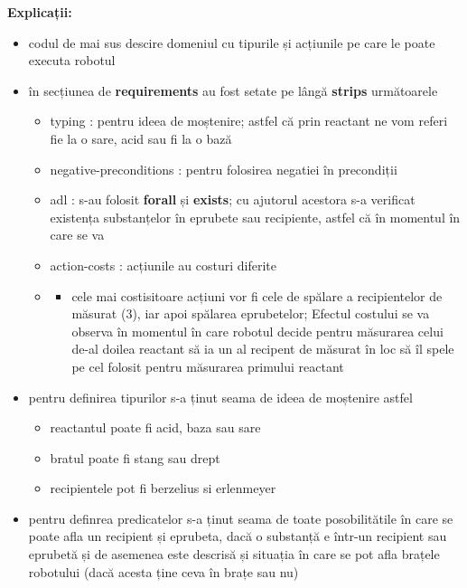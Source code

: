 \textbf{Explicații:}
\begin{itemize}
    \setlength\itemsep{0em}
    \item codul de mai sus descire domeniul cu tipurile și acțiunile pe care le poate executa robotul
    \item în secțiunea de \textbf{requirements} au fost setate pe lângă \textbf{strips} următoarele 
        \begin{itemize}
        \item typing : pentru ideea de moștenire; astfel că prin reactant ne vom referi fie la o sare, acid sau fi la o bază
        \item negative-preconditions : pentru folosirea negatiei în precondiții 
        \item adl : s-au folosit \textbf{forall} și \textbf{exists}; cu ajutorul acestora s-a verificat existența substanțelor în eprubete sau recipiente, astfel că în momentul în care se va 
        \item action-costs : acțiunile au costuri diferite
        \item   \begin{itemize}
                \setlength\itemsep{0em}
                \item cele mai costisitoare acțiuni vor fi cele de spălare a recipientelor de măsurat (3), iar apoi spălarea eprubetelor; Efectul costului se va observa în momentul în care robotul decide pentru măsurarea celui de-al doilea reactant să ia un al recipent de măsurat în loc să îl spele pe cel folosit pentru măsurarea primului reactant
                \end{itemize}
        \end{itemize}
    \item pentru definirea tipurilor s-a ținut seama de ideea de moștenire astfel 
        \begin{itemize}
        \item reactantul poate fi acid, baza sau sare
        \item bratul poate fi stang sau drept
        \item recipientele pot fi berzelius si erlenmeyer
        \end{itemize}
    \item pentru definrea predicatelor s-a ținut seama de toate posobilitătile în care se poate afla un recipient și eprubeta, dacă o substanță e într-un recipient sau eprubetă și de asemenea este descrisă și situația în care se pot afla brațele robotului (dacă acesta ține ceva în brațe sau nu)

\end{itemize}
